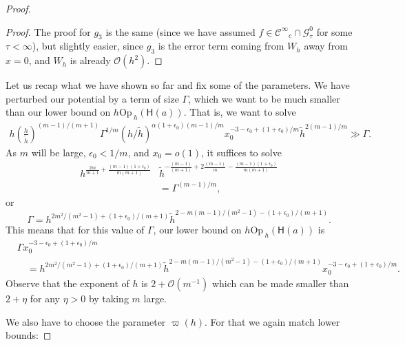 \documentclass[twoside, final]{amsart}
\theoremstyle{definition}
\numberwithin{equation}{section}
\begin{document}
\begin{proof}
\begin{proof}
The proof for $g_3$ is the same (since we have assumed $f \in {{\mathcal C}^\infty}_c
\cap {\mathcal{G}}^0_\tau$ for some $\tau < \infty$), but slightly easier, since $g_3$ is
the error term coming from $W_h$ away from $x = 0$, and $W_h$ is
already ${{\mathcal O}}(h^2)$.

\end{proof}

Let us recap what we have shown so far and fix some of the
parameters.  We have perturbed our potential by a term of size
$\Gamma$, which we want to be much smaller than our lower bound on 
$h {\mathrm{Op}\,}_h({{\textsf{H}}} (a))$.  That is, we want to solve
\begin{align*}
h \left( \frac{h}{\tilde{h}} \right)^{(m-1)/(m+1)} \Gamma^{1/m} (h/{\tilde{h}})^{  \alpha(1+\epsilon_0 ) ( m-1)/m  } x_0^{  -3
  -\epsilon_0 + (1+ \epsilon_0 )/m  } {\tilde{h}}^{2(m-1)/m} 
\gg \Gamma.
\end{align*}
As $m$ will be large, $\epsilon_0 < 1/m$, and $x_0 = o(1)$, it
suffices to solve
\begin{align*}
h^{\frac{2m}{m+1} + \frac{(m-1)(1 + \epsilon_0)}{m(m+1)} } & {\tilde{h}}^{-\frac{(m-1)}{(m+1)}
  +2\frac{(m-1)}{m} - \frac{(m-1)(1 + \epsilon_0)}{m(m+1)} } \\
& = \Gamma^{(m-1)/m},
\end{align*}
or 
\[
\Gamma = h^{ 2m^2/(m^2-1) +  (1+ \epsilon_0) /(m+1)} {\tilde{h}}^{2
  -m(m-1)/(m^2-1) -  (1+ \epsilon_0) /(m+1)  }.
\]
This means that for this value of $\Gamma$, our lower bound on $h
{\mathrm{Op}\,}_h({{\textsf{H}}} (a))$
is 
\begin{align*}
& \Gamma 
x_0^{  -3
  -\epsilon_0 + (1+ \epsilon_0 )/m  } \\
& \quad = h^{ 2m^2/(m^2-1) +  (1+ \epsilon_0) /(m+1)} {\tilde{h}}^{2
  -m(m-1)/(m^2-1) -  (1+ \epsilon_0) /(m+1)  }
x_0^{  -3
  -\epsilon_0 + (1+ \epsilon_0 )/m  } .
\end{align*}
Observe that the exponent of $h$ is $2 + {{\mathcal O}}(m^{-1})$ which can be made
smaller than $2 + \eta$ for any $\eta>0$ by taking $m$ large.

We also have to choose the parameter $\varpi(h)$.  For that we again
match lower bounds:


\end{proof}
\end{document}
